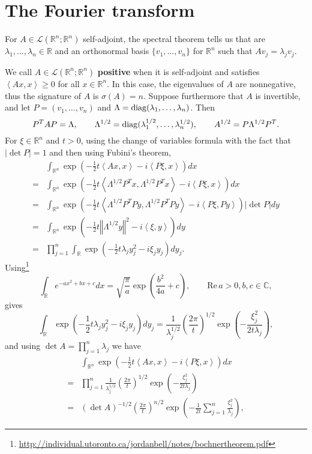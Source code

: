 \documentclass{article}
\newcommand{\inner}[2]{\left\langle #1, #2 \right\rangle}
\def\Re{\ensuremath{\mathrm{Re}}\,}
\newcommand{\diag}{\ensuremath\mathrm{diag}}
\newcommand{\norm}[1]{\left\Vert #1 \right\Vert}
\theoremstyle{definition}
\begin{document}
\section{The Fourier transform}
For $A \in \mathscr{L}(\mathbb{R}^n;\mathbb{R}^n)$ self-adjoint, 
the spectral theorem tells us that
are $\lambda_1,\ldots,\lambda_n \in \mathbb{R}$ and
an orthonormal basis $\{v_1,\ldots,v_n\}$ for $\mathbb{R}^n$ such that
$A v_j = \lambda_j v_j$.  


We call $A \in \mathscr{L}(\mathbb{R}^n;\mathbb{R}^n)$ \textbf{positive}
when it is self-adjoint and satisfies
 $\inner{Ax}{x} \geq 0$ for all $x \in \mathbb{R}^n$. 
In this case, the eigenvalues of $A$ are nonnegative, thus the signature of
$A$ is $\sigma(A)=n$. 
Suppose furthermore that $A$ is invertible, and
let $P=(v_1,\ldots,v_n)$ and $\Lambda=\diag(\lambda_1,\ldots,\lambda_n)$. 
Then
\[
P^T A P = \Lambda,\qquad \Lambda^{1/2} = \diag(\lambda_1^{1/2},\ldots,\lambda_n^{1/2}),
\qquad A^{1/2} = P\Lambda^{1/2}P^T.
\]
For $\xi \in \mathbb{R}^n$ and $t>0$, using the change of variables formula with the fact that 
$|\det P|=1$ and then using Fubini's theorem,
\[
\begin{split}
&\int_{\mathbb{R}^n} \exp\left(-\frac{1}{2}t \inner{Ax}{x}-i\inner{P\xi}{x}\right) dx\\
=&\int_{\mathbb{R}^n} \exp\left(-\frac{1}{2}t \inner{\Lambda^{1/2}P^Tx}{\Lambda^{1/2}P^Tx} -i \inner{P\xi}{x}\right) dx\\
=&\int_{\mathbb{R}^n} \exp\left(-\frac{1}{2}t \inner{\Lambda^{1/2}P^T Py}{\Lambda^{1/2}P^T Py}-i\inner{P\xi}{Py}\right)  |\det P| dy\\
=&\int_{\mathbb{R}^n} \exp\left(-\frac{1}{2}t
\norm{\Lambda^{1/2} y}^2 -i \inner{\xi}{y} \right) dy\\
=&\prod_{j=1}^n \int_{\mathbb{R}} \exp\left(-\frac{1}{2} t \lambda_j y_j^2 -i \xi_j y_j \right) dy_j.
\end{split}
\]
Using\footnote{\url{http://individual.utoronto.ca/jordanbell/notes/bochnertheorem.pdf}} 
\[
\int_{\mathbb{R}} e^{-ax^2+bx+c} dx = \sqrt{\frac{\pi}{a}} \exp\left(\frac{b^2}{4a}+c\right),
\qquad \Re a>0, b,c \in \mathbb{C},
\]
gives
\[
\int_{\mathbb{R}} \exp\left(-\frac{1}{2} t \lambda_j y_j^2 -i \xi_j y_j \right) dy_j
=\frac{1}{\lambda_j^{1/2}} \left( \frac{2\pi}{t}\right)^{1/2} \exp\left(-\frac{\xi_j^2}{2t\lambda_j}\right),
\]
and using $\det A = \prod_{j=1}^n \lambda_j$ 
we have
\[
\begin{split}
&\int_{\mathbb{R}^n} \exp\left(-\frac{1}{2}t \inner{Ax}{x}-i\inner{P\xi}{x}\right) dx\\
=&\prod_{j=1}^n\frac{1}{\lambda_j^{1/2}} \left( \frac{2\pi}{t}\right)^{1/2} \exp\left(-\frac{\xi_j^2}{2t\lambda_j}\right)\\
=&(\det A)^{-1/2} \left(\frac{2\pi}{t}\right)^{n/2} \exp\left(-\frac{1}{2t}\sum_{j=1}^n \frac{\xi_j^2}{\lambda_j} \right),
\end{split}
\]
\end{document}
